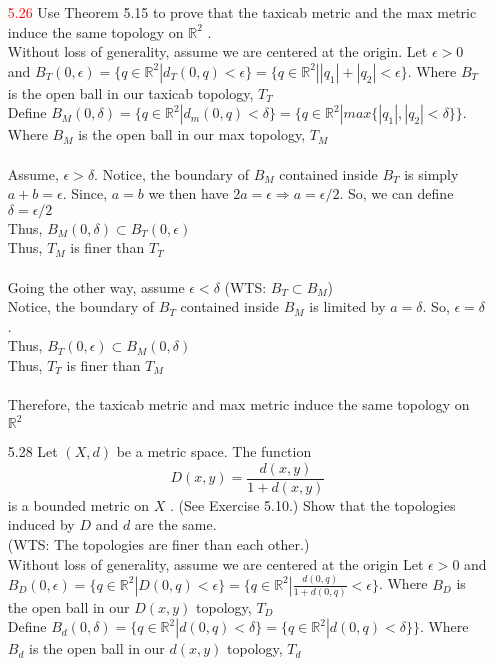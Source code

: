\documentclass[12pt]{article}
\newcommand{\R}{\mathbb{R}}
\begin{document}
\begin{enumerate}
		\item[\textcolor{red}{5.26}] Use Theorem 5.15 to prove that the taxicab metric and the max metric induce the same topology on $\mathbb { R } ^ { 2 }$ .\\
		Without loss of generality, assume we are centered at the origin.
		Let $\epsilon > 0 $ and $B_T(0,\epsilon)=\{q\in\R^2|d_T(0,q)<\epsilon\}=\{q\in\R^2||q_1|+|q_2|<\epsilon\} $. Where $ B_T $ is the open ball in our taxicab topology, $ T_T $ \\
		Define $  B_M(0,\delta)=\{q\in\R^2|d_m(0,q)<\delta\}=\{q\in\R^2|max\{|q_1|,|q_2|<\delta\}\} $.  Where $ B_M $ is the open ball in our max topology, $ T_M $ \\ 
		\\
		Assume, $ \epsilon > \delta $. Notice, the boundary of $ B_M  $ contained inside $ B_T $ is simply $ a+b=\epsilon $. Since, $ a=b $ we then have $ 2a=\epsilon \Rightarrow a=\epsilon/2$. So, we can define $ \delta = \epsilon/2 $\\
		Thus, $ B_M(0,\delta)\subset B_T(0,\epsilon) $\\
		Thus, $ T_M $ is finer than $ T_T $\\
		\\
		Going the other way, assume $ \epsilon < \delta $ (WTS: $ B_T \subset B_M$)\\
		Notice, the boundary of $ B_T $ contained inside $ B_M $ is limited by $ a = \delta $.  So, $ \epsilon = \delta $.\\
		Thus, $ B_T(0,\epsilon) \subset B_M(0,\delta) $\\
		Thus, $ T_T $ is finer than $ T_M$\\
		\\
		Therefore, the taxicab metric and max metric induce the same topology on $ \R^2 $
		\item[5.28] Let $( X , d )$ be a metric space. The function
		\[D ( x , y ) = \frac { d ( x , y ) } { 1 + d ( x , y ) }\]
		is a bounded metric on $X$ . (See Exercise 5.10.) Show that the topologies
		induced by $D$ and $d$ are the same.\\
		(WTS: The topologies are finer than each other.)\\
		Without loss of generality, assume we are centered at the origin
		Let $\epsilon > 0 $ and $B_D(0,\epsilon)=\{q\in\R^2|D(0,q)<\epsilon\}=\{q\in\R^2|\frac{d(0,q)}{1+d(0,q)}<\epsilon\} $. Where $ B_D $ is the open ball in our $ D(x,y) $ topology, $ T_D $ \\
		Define $ B_d(0,\delta)=\{q\in\R^2|d(0,q)<\delta\}=\{q\in\R^2|d(0,q)<\delta\}\} $.  Where $ B_d $ is the open ball in our $ d(x,y) $ topology, $ T_d $ \\ 

\end{enumerate}
\end{document}
